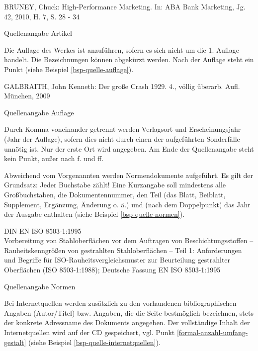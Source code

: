 \begin{example}[H]
    \begin{framed}
        BRUNEY, Chuck: High-Performance Marketing. In: ABA Bank Marketing, Jg. 42, 2010, H. 7, S. 28 - 34
    \end{framed}
    \caption{Quellenangabe Artikel}
    \label{bsp-quelle-artikel}
\end{example}

Die Auflage des Werkes ist anzuführen, sofern es sich nicht um die 1. Auflage handelt.
Die Bezeichnungen können abgekürzt werden.
Nach der Auflage steht ein Punkt (siehe Beispiel \ref{bsp-quelle-auflage}).

\begin{example}[H]
    \begin{framed}
        GALBRAITH, John Kenneth: Der große Crash 1929. 4., völlig überarb. Aufl. München, 2009
    \end{framed}
    \caption{Quellenangabe Auflage}
    \label{bsp-quelle-auflage}
\end{example}

Durch Komma voneinander getrennt werden Verlagsort und Erscheinungsjahr (Jahr der Auflage), sofern dies nicht durch einen der aufgeführten Sonderfälle unnötig ist.
Nur der erste Ort wird angegeben.
Am Ende der Quellenangabe steht kein Punkt, außer nach f. und ff.

Abweichend vom Vorgenannten werden Normendokumente aufgeführt.
Es gilt der Grundsatz: Jeder Buchstabe zählt!
Eine Kurzangabe soll mindestens alle Großbuchstaben, die Dokumentennummer, den Teil (das Blatt, Beiblatt, Supplement, Ergänzung, Änderung o. ä.) und (nach dem Doppelpunkt) das Jahr der Ausgabe enthalten (siehe Beispiel \ref{bsp-quelle-normen}).

\begin{example}[H]
    \begin{framed}
        DIN EN ISO 8503-1:1995\\
        Vorbereitung von Stahloberflächen vor dem Auftragen von Beschichtungsstoffen – Rauheitskenngrößen von gestrahlten Stahloberflächen – Teil 1: Anforderungen und Begriffe für ISO-Rauheitsvergleichsmuster zur Beurteilung gestrahlter Oberflächen (ISO 8503-1:1988); Deutsche Fassung EN ISO 8503-1:1995
    \end{framed}
    \caption{Quellenangabe Normen}
    \label{bsp-quelle-normen}
\end{example}

Bei Internetquellen werden zusätzlich zu den vorhandenen bibliographischen Angaben (Autor/Titel) bzw. Angaben, die die Seite bestmöglich bezeichnen, stets der konkrete Adressname des Dokuments angegeben.
Der vollständige Inhalt der Internetquellen wird auf der \ac{CD} gespeichert, vgl. Punkt \ref{formal-anzahl-umfang-gestalt} (siehe Beispiel \ref{bsp-quelle-internetquellen}).

